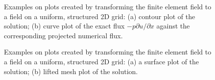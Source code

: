\begin{figure}
  \begin{center}
    \label{langtangen:poisson:2D:fig2}
    \caption{Examples on plots created by transforming the finite
      element field to a field on a uniform, structured 2D grid: (a)
      contour plot of the solution; (b) curve plot of the exact flux
      $-p\partial u/\partial x$ against the corresponding projected
      numerical flux.}
  \end{center}
\end{figure}

\begin{figure}
  \begin{center}
    \label{langtangen:poisson:2D:fig3}
    \caption{Examples on plots created by transforming the finite
      element field to a field on a uniform, structured 2D grid: (a) a
      surface plot of the solution; (b) lifted mesh plot of the
    solution.}
  \end{center}
\end{figure}

